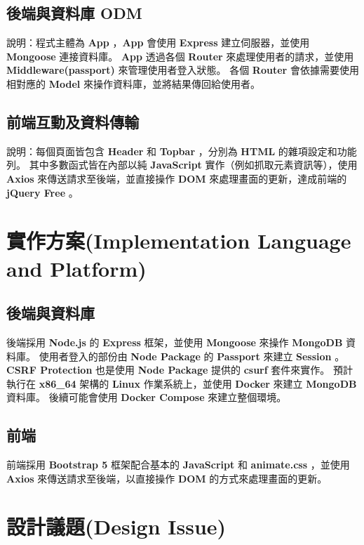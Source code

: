 \documentclass{article}
\begin{document}
\subsection{後端與資料庫 ODM}



\bigskip

說明：程式主體為 \textbf{App} ，\textbf{App} 會使用 \textbf{Express} 建立伺服器，並使用 \textbf{Mongoose} 連接資料庫。
\textbf{App} 透過各個 \textbf{Router} 來處理使用者的請求，並使用 \textbf{Middleware(passport)} 來管理使用者登入狀態。
各個 \textbf{Router} 會依據需要使用相對應的 \textbf{Model} 來操作資料庫，並將結果傳回給使用者。

\pagebreak

\subsection{前端互動及資料傳輸}



說明：每個頁面皆包含 \textbf{Header} 和 \textbf{Topbar} ，分別為 \textbf{HTML} 的雜項設定和功能列。
其中多數函式皆在內部以純 \textbf{JavaScript} 實作（例如抓取元素資訊等），使用 \textbf{Axios} 來傳送請求至後端，並直接操作 \textbf{DOM} 來處理畫面的更新，達成前端的 \textbf{jQuery Free} 。

\newpage

\section[實作方案(IMPLEMENTATION LANGUAGE AND PLATFORM)]{實作方案(Implementation Language and Platform)}

\subsection{後端與資料庫}

後端採用 \textbf{Node.js} 的 \textbf{Express} 框架，並使用 \textbf{Mongoose} 來操作 \textbf{MongoDB} 資料庫。
使用者登入的部份由 \textbf{Node Package} 的 \textbf{Passport} 來建立 \textbf{Session} 。
\textbf{CSRF Protection} 也是使用 \textbf{Node Package} 提供的 \textbf{csurf} 套件來實作。
預計執行在 \textbf{x86\_64} 架構的 \textbf{Linux} 作業系統上，並使用 \textbf{Docker} 來建立 \textbf{MongoDB} 資料庫。
後續可能會使用 \textbf{Docker Compose} 來建立整個環境。

\subsection{前端}

前端採用 \textbf{Bootstrap 5} 框架配合基本的 \textbf{JavaScript} 和 \textbf{animate.css} ，並使用 \textbf{Axios} 來傳送請求至後端，以直接操作 \textbf{DOM} 的方式來處理畫面的更新。

\newpage

\section[設計議題(DESIGN ISSUE)]{設計議題(Design Issue)}
\end{document}
